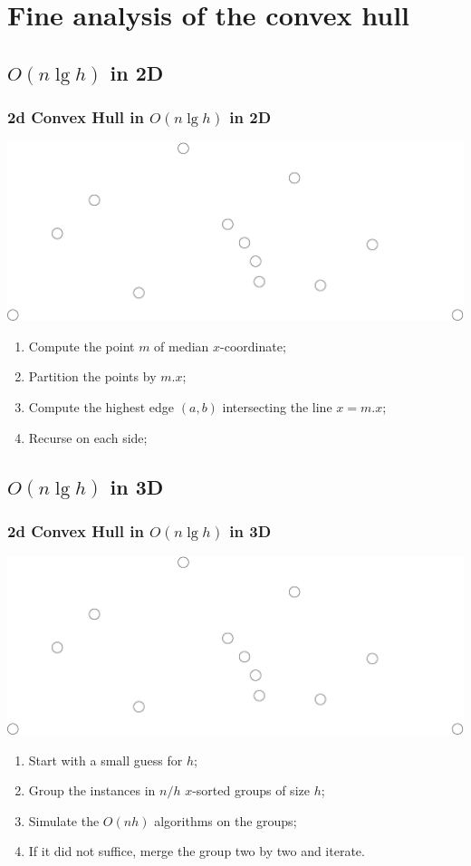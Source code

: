 \documentclass{beamer}
\begin{document}
\section{Fine analysis of the convex hull}

\subsection{$O(n\lg h)$ in 2D}
\begin{frame}
  \frametitle{2d Convex Hull in $O(n\lg h)$ in 2D}
  \includegraphics[width=\textwidth]{points}
  \begin{enumerate}
  \item Compute the point $m$ of median $x$-coordinate;
  \item Partition the points by $m.x$;
  \item Compute the highest edge $(a,b)$ intersecting the line $x=m.x$;
  \item Recurse on each side;
  \end{enumerate}
\end{frame}

\subsection{$O(n\lg h)$ in 3D}
\begin{frame}
  \frametitle{2d Convex Hull in $O(n\lg h)$ in 3D}
  \includegraphics[width=\textwidth]{points}
  \begin{enumerate}
  \item Start with a small guess for $h$;
  \item Group the instances in $n/h$ $x$-sorted groups of size $h$;
  \item Simulate the $O(nh)$ algorithms on the groups;
  \item If it did not suffice, merge the group two by two and iterate.
  \end{enumerate}
\end{frame}
\end{document}
